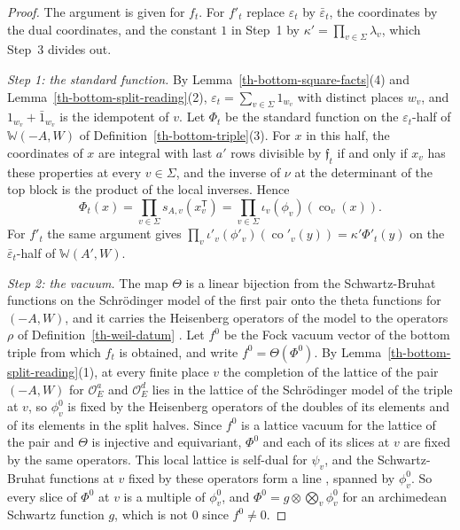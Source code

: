 \begin{proof}
The argument is given for $f_t$. For $f'_t$ replace $\varepsilon_t$ by
$\bar\varepsilon_t$, the coordinates by the dual coordinates, and the constant
$1$ in Step~1 by $\kappa'=\prod_{v\in\Sigma}\lambda_v$, which Step~3 divides
out.

\emph{Step 1: the standard function.} By Lemma~\ref{th-bottom-square-facts}(4)
and Lemma~\ref{th-bottom-split-reading}(2),
$\varepsilon_t=\sum_{v\in\Sigma}1_{w_v}$ with distinct places $w_v$, and
$1_{w_v}+\bar1_{w_v}$ is the idempotent of $v$. Let $\Phi_t$ be the standard
function on the $\varepsilon_t$-half of $\mathbb W(-A,W)$ of
Definition~\ref{th-bottom-triple}(3). For $x$ in this half, the coordinates of
$x$ are integral with last $a'$ rows divisible by $\mathfrak f_t$ if and only
if $x_v$ has these properties at every $v\in\Sigma$, and the inverse of $\nu$ at
the determinant of the top block is the product of the local inverses. Hence
\[
\Phi_t(x)=\prod_{v\in\Sigma}s_{A,v}(x_v^{\mathsf T})
=\prod_{v\in\Sigma}\iota_v(\phi_v)(\operatorname{co}_v(x)).
\]
For $f'_t$ the same argument gives
$\prod_v\iota'_v(\phi'_v)(\operatorname{co}'_v(y))=\kappa'\Phi'_t(y)$ on the
$\bar\varepsilon_t$-half of $\mathbb W(A',W)$.

\emph{Step 2: the vacuum.} The map $\Theta$ is a linear bijection from the
Schwartz-Bruhat functions on the Schrödinger model of the first pair onto the
theta functions for $(-A,W)$, and it carries the Heisenberg operators of the
model to the operators $\rho$ of Definition~\ref{th-weil-datum}
\cite{Wei64}. Let $f^0$ be the Fock vacuum vector of the bottom triple from
which $f_t$ is obtained, and write $f^0=\Theta(\Phi^0)$. By
Lemma~\ref{th-bottom-split-reading}(1), at every finite place $v$ the
completion of the lattice of the pair $(-A,W)$ for $\mathcal O_E^a$ and
$\mathcal O_E^d$ lies in the lattice of the Schrödinger model of the triple at
$v$, so $\phi^0_v$ is fixed by the Heisenberg operators of the doubles of its
elements and of its elements in the split halves. Since $f^0$ is a lattice
vacuum for the lattice of the pair and $\Theta$ is injective and equivariant,
$\Phi^0$ and each of its slices at $v$ are fixed by the same operators. This
local lattice is self-dual for $\psi_v$, and the Schwartz-Bruhat functions at
$v$ fixed by these operators form a line \cite{MVW87}, spanned by $\phi^0_v$.
So every slice of $\Phi^0$ at $v$ is a multiple of $\phi^0_v$, and
$\Phi^0=g\otimes\bigotimes_v\phi^0_v$ for an archimedean Schwartz function $g$,
which is not $0$ since $f^0\neq0$.


\end{proof}

